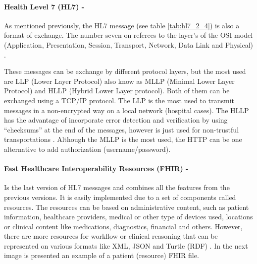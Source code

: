 \documentclass[mim_thesis.tex]{subfiles}
\begin{document}
\paragraph{\textbf{Health Level 7 (HL7) -}}
As mentioned previously, the HL7 message (see table \ref{tab:hl7_2_4}) is also a format of exchange. The number seven on referees to the layer’s of the OSI model (Application, Presentation, Session, Transport, Network, Data Link and Physical) \citep{iso1994iec}.

These messages can be exchange by different protocol layers, but the most used are LLP (Lower Layer Protocol) also know as MLLP (Minimal Lower Layer Protocol) and HLLP (Hybrid Lower Layer protocol).  Both of them can be exchanged using a TCP/IP protocol. The LLP is the most used to transmit messages in a non-encrypted way on a local network (hospital cases). The HLLP has the advantage of incorporate error detection and verification by using “checksums” at the end of the messages, however is just used for non-trustful transportations \citep{grieve2012hl7}. Although the MLLP is the most used, the HTTP can be one alternative to add authorization (username/password).


\paragraph{\textbf{Fast Healthcare Interoperability Resources (FHIR) -}}
Is the last version of HL7 messages and combines all the features from the previous versions. It is easily implemented due to a set of components called resources. The resources can be based on administrative content, such as patient information, healthcare providers, medical or other type of devices used, locations or clinical content like medications, diagnostics, financial and others. However, there are more resources for workflow or clinical reasoning that can be represented on various formats like XML, JSON and Turtle (RDF) \citep{FHIR2017}. In the next image is presented an example of a patient (resource) FHIR file.
\end{document}
